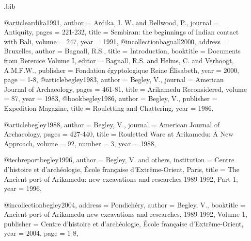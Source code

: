\begin{filecontents}{\IJSRAidentifier.bib}

@article{ardika1991,
	author = {Ardika, I. W. and Bellwood, P.},
	journal = {Antiquity},
	pages = {221-232},
	title = {Sembiran: the beginnings of Indian contact with Bali},
	volume = {247},
	year = {1991},
}
@incollection{bagnall2000,
	address = {Bruxelles},
	author = {Bagnall, R.S.},
	title = {Introduction},
	booktitle = {Documents from Berenice Volume I},
	editor = {Bagnall, R.S. and Helms, C. and Verhoogt, A.M.F.W.},
	publisher = {Fondation égyptologique Reine Élisabeth},
	year = {2000},
	page = {1-8},
}
@article{begley1983,
	author = {Begley, V.},
	journal = {American Journal of Archaeology},
	pages = {461-81},
	title = {Arikamedu Reconsidered},
	volume = {87},
	year = {1983},
}
@book{begley1986,
	author = {Begley, V.},
	publisher = {Expedition Magazine},
	title = {Rouletting and Chattering},
	year = {1986},
}

@article{begley1988,
	author = {Begley, V.},
	journal = {American Journal of Archaeology},
	pages = {427-440},
	title = {Rouletted Ware at Arikamedu: A New Approach},
	volume = {92},
	number = {3},
	year = {1988},
}

@techreport{begley1996,
	author = {Begley, V. and others},
	institution = {Centre d'histoire et d'archéologie, École française d'Extrême-Orient, Paris},
	title = {The Ancient port of Arikamedu: new excavations and researches 1989-1992, Part 1},
	year = {1996},
}

@incollection{begley2004,
	address = {Pondichéry},
	author = {Begley, V.},
	booktitle = {Ancient port of Arikamedu new excavations and researches, 1989-1992, Volume 1},
	publisher = {Centre d'histoire et d'archéologie, École française d'Extrême-Orient},
	year = {2004},
	page = {1-8},
}


\end{filecontents}
